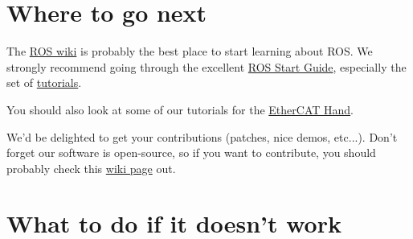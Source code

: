 \documentclass[12pt]{article}
\begin{document}
\newpage

\section{Where to go next}
\label{sec:where-to-go}
\par The \href{http://ros.org/wiki}{ROS wiki} is probably the best place to start learning about ROS. We strongly recommend going through the excellent \href{http://ros.org/wiki/ROS/StartGuide}{ROS Start Guide}, especially the set of \href{http://ros.org/wiki/ROS/Tutorials}{tutorials}.\\

\par You should also look at some of our tutorials for the \href{http://ros.org/wiki/shadow_robot_etherCAT/Tutorials}{EtherCAT Hand}.\\

\par We'd be delighted to get your contributions (patches, nice demos, etc...). Don't forget our software is open-source, so if you want to contribute, you should probably check this \href{http://ros.org/wiki/shadow_robot#Contributing}{wiki page} out.
\newpage

\section{What to do if it doesn't work}
\label{sec:what-do-if}
\end{document}
